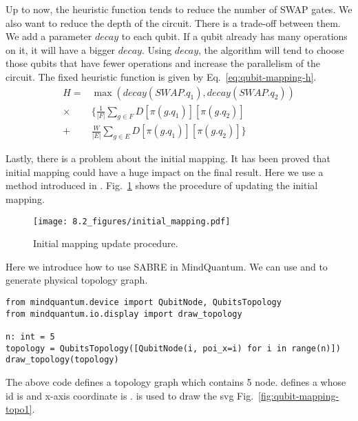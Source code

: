 Up to now, the heuristic function tends to reduce the number of SWAP gates. We also want to reduce the depth of the circuit. There is a trade-off between them. We add a parameter $decay$ to each qubit. If a qubit already has many operations on it, it will have a bigger $decay$. Using $decay$, the algorithm will tend to choose those qubits that have fewer operations and increase the parallelism of the circuit. The fixed heuristic function is given by
Eq.~\eqref{eq:qubit-mapping-h}.
\begin{equation} \label{eq:qubit-mapping-h}
	\begin{aligned}
		H = & \max \left( decay(SWAP.q_1), decay(SWAP.q_2) \right)  \\
		\times & \Big\lbrace \frac{1}{|F|} \sum_{g \in F} D[\pi(g.q_1)][\pi(g.q_2)] \\
		+ & \frac{W}{|E|} \sum_{g \in E} D[\pi(g.q_1)][\pi(g.q_2)] \Big\rbrace
	\end{aligned}
\end{equation} 

Lastly, there is a problem about the initial mapping. It has been proved that initial mapping could have a huge impact on the final result. Here we use a method introduced in \cite{li2019tackling}.
Fig.~\ref{fig:qubit-mapping-initial-mapping}
shows the procedure of updating the initial mapping.

\begin{figure}
	\centering
	\texttt{[image: 8.2\_figures/initial\_mapping.pdf]}
	\caption{Initial mapping update procedure.}
	\label{fig:qubit-mapping-initial-mapping}
\end{figure}

Here we introduce how to use SABRE in MindQuantum. We can use  and  to generate physical topology graph.

\begin{lstlisting}
from mindquantum.device import QubitNode, QubitsTopology
from mindquantum.io.display import draw_topology

n: int = 5
topology = QubitsTopology([QubitNode(i, poi_x=i) for i in range(n)])
draw_topology(topology)
\end{lstlisting}

The above code defines a topology graph which contains 5 node.  defines a  whose id is  and x-axis coordinate is .  is used to draw the svg Fig.~\ref{fig:qubit-mapping-topo1}.


